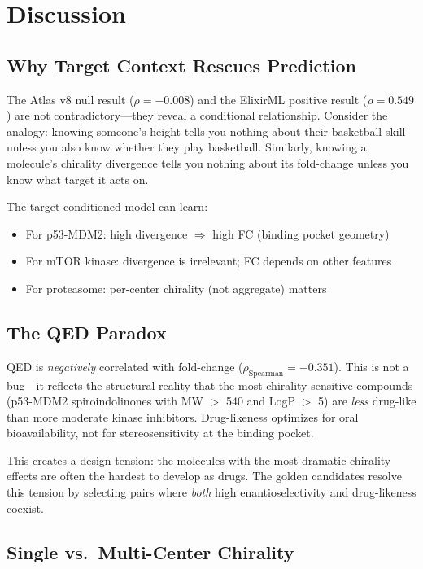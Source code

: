 \documentclass[11pt,a4paper]{article}
\newcommand{\rhosp}{\rho_{\text{Spearman}}}
\begin{document}
\section{Discussion}

\subsection{Why Target Context Rescues Prediction}

The Atlas v8 null result ($\rho = -0.008$) and the ElixirML positive
result ($\rho = 0.549$) are not contradictory---they reveal a conditional
relationship. Consider the analogy: knowing someone's height tells you
nothing about their basketball skill unless you also know whether they
play basketball. Similarly, knowing a molecule's chirality divergence
tells you nothing about its fold-change unless you know what target
it acts on.

The target-conditioned model can learn:
\begin{itemize}[nosep]
    \item For p53-MDM2: high divergence $\Rightarrow$ high FC (binding pocket geometry)
    \item For mTOR kinase: divergence is irrelevant; FC depends on other features
    \item For proteasome: per-center chirality (not aggregate) matters
\end{itemize}

\subsection{The QED Paradox}

QED is \emph{negatively} correlated with fold-change ($\rhosp = -0.351$).
This is not a bug---it reflects the structural reality that the most
chirality-sensitive compounds (p53-MDM2 spiroindolinones with MW $>$ 540
and LogP $>$ 5) are \emph{less} drug-like than more moderate kinase
inhibitors. Drug-likeness optimizes for oral bioavailability, not for
stereosensitivity at the binding pocket.

This creates a design tension: the molecules with the most dramatic
chirality effects are often the hardest to develop as drugs. The golden
candidates resolve this tension by selecting pairs where \emph{both}
high enantioselectivity and drug-likeness coexist.

\subsection{Single vs.\ Multi-Center Chirality}
\end{document}
